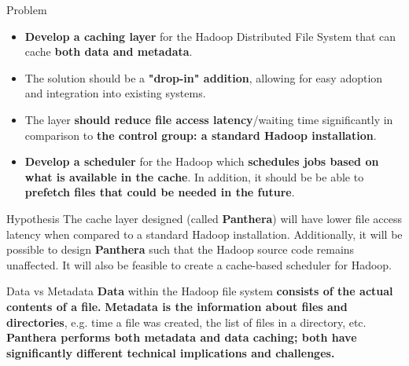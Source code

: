 \documentclass[final]{beamer} %
\begin{document}
\begin{frame}
\begin{columns}[t]
\begin{column}{0.32\textwidth}
    \begin{block}{Problem}
	\begin{itemize}
	 \item \textbf{Develop a caching layer} for the Hadoop Distributed File System that can cache \textbf{both data and metadata}.
	 \item The solution should be a \textbf{"drop-in" addition}, allowing for easy adoption and integration into existing systems.
	 \item The layer \textbf{should reduce file access latency}/waiting time significantly in comparison to \textbf{the control group: a standard Hadoop installation}.
	 \item \textbf{Develop a scheduler} for the Hadoop which \textbf{schedules jobs based on what is available in the cache}. In addition, it should be be able to \textbf{prefetch files that could be needed in the future}.
	\end{itemize}

      \end{block}

      \begin{block}{Hypothesis}
       The cache layer designed (called \textbf{Panthera}) will have lower file
       access latency when compared to a standard Hadoop installation. Additionally, it
       will be possible to design \textbf{Panthera} such that the Hadoop source code
       remains unaffected. It will also be feasible to create a cache-based 
       scheduler for Hadoop.
      \end{block}
	  
		\begin{block}{Data vs Metadata}
			\textbf{Data} within the Hadoop file system \textbf{consists of the actual contents of a file.}
			\textbf{Metadata is the information about files and directories}, e.g. time a file was created, the list of files in a directory, etc. \textbf{Panthera performs both metadata
			and data caching; both have significantly different technical implications
			and challenges.}
		\end{block}
	

\end{column}
\end{columns}
\end{frame}
\end{document}
